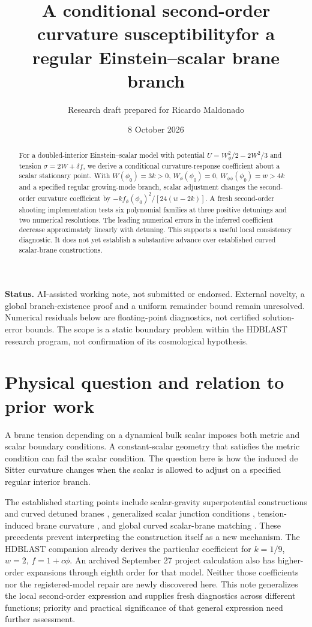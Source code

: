 \documentclass[11pt]{article}
\title{A conditional second-order curvature susceptibility\newline for a regular Einstein--scalar brane branch}
\author{Research draft prepared for Ricardo Maldonado}
\date{8 October 2026}
\begin{document}
\maketitle
\noindent\textbf{Status.} AI-assisted working note, not submitted or endorsed. External novelty, a global branch-existence proof and a uniform remainder bound remain unresolved. Numerical residuals below are floating-point diagnostics, not certified solution-error bounds. The scope is a static boundary problem within the HDBLAST research program, not confirmation of its cosmological hypothesis.

\begin{abstract}
For a doubled-interior Einstein--scalar model with potential $U=W_\phi^2/2-2W^2/3$ and tension $\sigma=2W+\delta f$, we derive a conditional curvature-response coefficient about a scalar stationary point. With $W(\phi_0)=3k>0$, $W_\phi(\phi_0)=0$, $W_{\phi\phi}(\phi_0)=w>4k$ and a specified regular growing-mode branch, scalar adjustment changes the second-order curvature coefficient by $-k f_\phi(\phi_0)^2/[24(w-2k)]$. A fresh second-order shooting implementation tests six polynomial families at three positive detunings and two numerical resolutions. The leading numerical errors in the inferred coefficient decrease approximately linearly with detuning. This supports a useful local consistency diagnostic. It does not yet establish a substantive advance over established curved scalar-brane constructions.
\end{abstract}

\section{Physical question and relation to prior work}
A brane tension depending on a dynamical bulk scalar imposes both metric and scalar boundary conditions. A constant-scalar geometry that satisfies the metric condition can fail the scalar condition. The question here is how the induced de Sitter curvature changes when the scalar is allowed to adjust on a specified regular interior branch.

The established starting points include scalar-gravity superpotential constructions and curved detuned branes \cite{dfgk}, generalized scalar junction conditions \cite{bv}, tension-induced brane curvature \cite{bdl}, and global curved scalar-brane matching \cite{gknw}. These precedents prevent interpreting the construction itself as a new mechanism. The HDBLAST companion \cite{maldonado} already derives the particular coefficient for $k=1/9$, $w=2$, $f=1+c\phi$. An archived September 27 project calculation also has higher-order expansions through eighth order for that model. Neither those coefficients nor the registered-model repair are newly discovered here. This note generalizes the local second-order expression and supplies fresh diagnostics across different functions; priority and practical significance of that general expression need further assessment.
\end{document}
